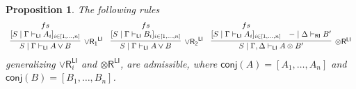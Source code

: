\documentclass[submission,copyright,creativecommons]{eptcs}
\newtheorem{proposition}[theorem]{Proposition}
\theoremstyle{definition}
\newcommand{\tr}{\otimes \mathsf{R}}
\newcommand{\orrone}{\lor \mathsf{R_{1}}}
\newcommand{\orrtwo}{\lor \mathsf{R_{2}}}
\newcommand{\orri}{\lor \mathsf{R}_{i}}
\newcommand{\ot}{\otimes}
\newcommand{\RI}{\mathsf{RI}}
\newcommand{\LI}{\mathsf{LI}}
\newcommand{\conj}[1]{\mathsf{conj} (#1)}
\begin{document}
\begin{proposition}\label{lem:GenRightRules}
  The following rules
  \begin{displaymath}
    \begin{array}{c}
      \infer[\orrone^{\LI}]{S \mid \Gamma \vdash_{\LI} A \lor B}{
        \deduce{[S \mid \Gamma \vdash_{\LI} A_i]_{i \in [1 , \dots , n]}}{fs}
      }
      \quad
      \infer[\orrtwo^{\LI}]{S \mid \Gamma \vdash_{\LI} A \lor B}{
        \deduce{[S \mid \Gamma \vdash_{\LI} B_i]_{i \in [1 , \dots , n]}}{fs}
      }
      \quad
      \infer[\tr^{\LI}]{S \mid \Gamma , \Delta \vdash_{\LI} A \ot B'}{
        \deduce{[S \mid \Gamma \vdash_{\LI} A_i]_{i \in [1 , \dots , n]}}{fs}
        &
        - \mid \Delta \vdash_{\RI} B'
      }
    \end{array}
  \end{displaymath}
  generalizing $\orri^{\LI}$ and $\tr^{\LI}$, are admissible, where $\conj{A} = [A_1 , \dots , A_n]$ and $\conj{B} = [B_1 , \dots , B_n]$.
\end{proposition}
\end{document}
